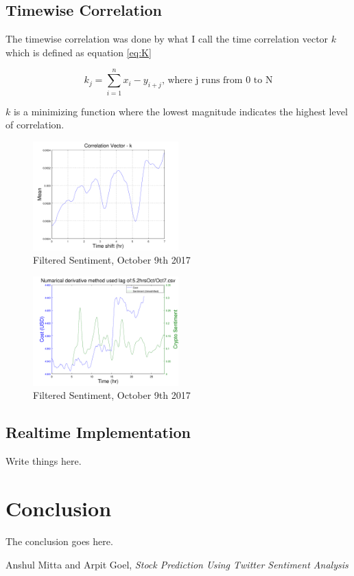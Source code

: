 \documentclass[12pt,journal,compsoc]{IEEEtran}
\begin{document}
\subsection{Timewise Correlation}
The timewise correlation was done by what I call the time correlation vector $k$ which is defined as equation \ref{eq:K}

\begin{equation}\label{eq:K}
k_j = \sum\limits_{i=1}^n x_i - y_{i+j} \textrm{, where j runs from 0 to N}
\end{equation}

$k$ is a minimizing function where the lowest magnitude indicates the highest level of correlation.

\begin{figure}[h]
	\centering
	\includegraphics[width=0.5\textwidth]{../Datasets/Plots/Oct7_K}
	\caption{Filtered Sentiment, October 9th 2017}
	\label{fig:FilteredSent}
\end{figure}

\begin{figure}[h]
	\centering
	\includegraphics[width=0.5\textwidth]{../Datasets/Plots/Oct7_CostSen}
	\caption{Filtered Sentiment, October 9th 2017}
	\label{fig:FilteredSent}
\end{figure}



\subsection{Realtime Implementation}
Write things here.


\section{Conclusion}
The conclusion goes here.


\begin{thebibliography}{1}

Anshul Mitta and Arpit Goel, \textit{Stock Prediction Using Twitter Sentiment Analysis}
\end{thebibliography}
\end{document}
